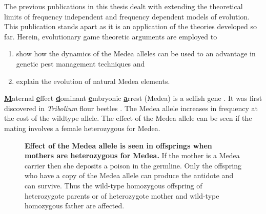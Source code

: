 \documentclass[oneside,11pt,a4paper]{book}
\begin{document}
The previous publications in this thesis dealt with extending the theoretical limits of frequency independent and frequency dependent models of evolution.
This publication stands apart as it is an application of the theories developed so far.
Herein, evolutionary game theoretic arguments are employed to 
\begin{enumerate}
\item show how the dynamics of the Medea alleles can be used to an advantage in genetic pest management techniques and 
\item explain the evolution of natural Medea elements.
\end{enumerate}
\textbf{\underline{M}}aternal \underline{\textbf{e}}ffect \underline{\textbf{d}}ominant \underline{\textbf{e}}mbryonic \underline{\textbf{a}}rrest (Medea) is a selfish gene \citep{hurst:1996aa,hurst:2001gg}.
It was first discovered in \textit{Tribolium} flour beetles \citep{beeman:1992aa}.
The Medea allele increases in frequency at the cost of the wildtype allele.
The effect of the Medea allele can be seen if the mating involves a female heterozygous for Medea.
%
\begin{figure}[h]
  \begin{center}
    \leavevmode
    \caption{\textbf{Effect of the Medea allele is seen in offsprings when mothers are heterozygous for Medea.}
    \small{If the mother is a Medea carrier then she deposits a poison in the germline.
    Only the offspring who have a copy of the Medea allele can produce the antidote and can survive.
    Thus the wild-type homozygous offspring of heterozygote parents or of heterozygote mother and wild-type homozygous father are affected.}
}
    \label{fig:medeasystem}
  \end{center}
\end{figure}
\end{document}
